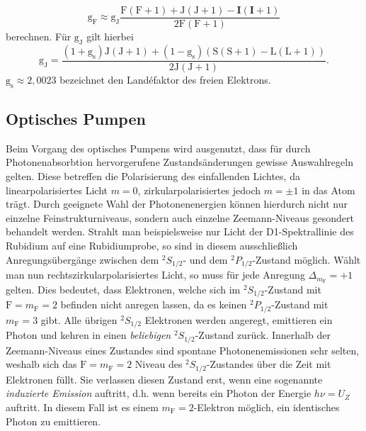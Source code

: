 \begin{equation}
  \text{g}_\text{F} \approx  \text{g}_\text{J} \frac{\text{F}\left(\text{F}+1\right)+\text{J}\left(\text{J}+1\right)-\mathbf{I}\left(\mathbf{I}+1\right)}{2\text{F}\left(\text{F}+1\right)}
  \label{eqn:gf}
\end{equation}
berechnen.
Für $\text{g}_\text{J}$ gilt hierbei
\begin{equation}
  \text{g}_\text{J} = \frac{(1+\text{g}_\text{s})\text{J}\left(\text{J}+1\right)+(1-\text{g}_\text{s})\left(\text{S}\left(\text{S}+1\right)-\text{L}\left(\text{L}+1\right)\right)}{2\text{J}\left(\text{J}+1\right)}.
  \label{eqn:gj}
\end{equation}
$\text{g}_\text{s}\approx 2,0023$ bezeichnet den Landéfaktor des freien Elektrons.

\subsection{Optisches Pumpen}
Beim Vorgang des optisches Pumpens wird ausgenutzt, dass für durch Photonenabsorbtion hervorgerufene Zustandsänderungen gewisse Auswahlregeln gelten.
Diese betreffen die Polarisierung des einfallenden Lichtes, da linearpolarisiertes Licht $m=0$, zirkularpolarisiertes jedoch $m=\pm1$ in das Atom trägt. Durch geeignete Wahl der Photonenenergien können hierdurch nicht nur einzelne Feinstrukturniveaus, sondern auch einzelne Zeemann-Niveaus gesondert behandelt werden.
Strahlt man beispielsweise nur Licht der D1-Spektrallinie des Rubidium auf eine Rubidiumprobe, so sind in diesem ausschließlich Anregungsübergänge zwischen dem $^2{S}_{1/2}$- und dem $^2{P}_{1/2}$-Zustand möglich. Wählt man nun rechtszirkularpolarisiertes Licht, so muss für jede Anregung $\Delta_{m_{\text{F}}}=+1$ gelten. Dies bedeutet, dass Elektronen, welche sich im $^2{S}_{1/2}$-Zustand mit $\text{F}=m_{\text{F}}=2$ befinden nicht anregen lassen, da es keinen $^2{P}_{1/2}$-Zustand mit $m_{\text{F}}=3$ gibt. Alle übrigen $^2{S}_{1/2}$ Elektronen werden angeregt, emittieren ein Photon und kehren in einen \textit{beliebigen} $^2{S}_{1/2}$-Zustand zurück. Innerhalb der Zeemann-Niveaus eines Zustandes sind spontane Photonenemissionen sehr selten, weshalb sich das $\text{F}=m_{\text{F}}=2$ Niveau des $^2{S}_{1/2}$-Zustandes über die Zeit mit Elektronen füllt.
Sie verlassen diesen Zustand erst, wenn eine sogenannte \textit{induzierte Emission} auftritt, d.h. wenn bereits ein Photon der Energie $h\nu = U_{Z}$ auftritt. In diesem Fall ist es einem $m_{\text{F}}=2$-Elektron möglich, ein identisches Photon zu emittieren.
